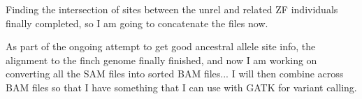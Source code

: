 \documentclass[idxtotoc,hyperref,openany,oneside]{labbook} %
\begin{document}
Finding the intersection of sites between the unrel and related ZF individuals finally completed, so I am going to concatenate the files now.

As part of the ongoing attempt to get good ancestral allele site info, the alignment to the finch genome finally finished, and now I am working on converting all the SAM files into sorted BAM files... I will then combine across BAM files so that I have something that I can use with GATK for variant calling.
\end{document}
